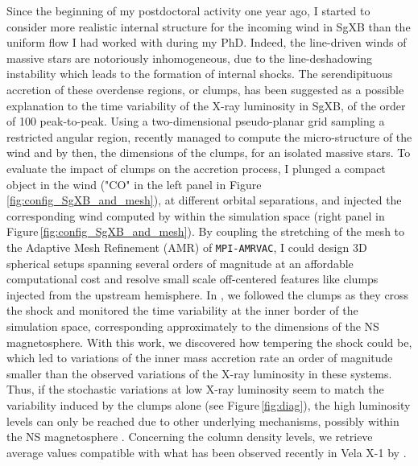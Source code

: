 \documentclass[a4paper,12pt,onecolumn]{article}
\makeatletter
\newcommand{\sgx}{SgXB\xspace}
\newcommand*{\ns}{NS\@\xspace}
\newcommand*{\eg}{e.g.\@\xspace}
\makeatother
\begin{document}
\indent Since the beginning of my postdoctoral activity one year ago, I started to consider more realistic internal structure for the incoming wind in \sgx than the uniform flow I had worked with during my PhD. Indeed, the line-driven winds of massive stars are notoriously inhomogeneous, due to the line-deshadowing instability \citep{Owocki1984a} which leads to the formation of internal shocks. The serendipituous accretion of these overdense regions, or clumps, has been suggested as a possible explanation to the time variability of the X-ray luminosity in \sgx, of the order of 100 peak-to-peak. Using a two-dimensional pseudo-planar grid sampling a restricted angular region, \cite{Sundqvist2017} recently managed to compute the micro-structure of the wind and by then, the dimensions of the clumps, for an isolated massive stars. To evaluate the impact of clumps on the accretion process, I plunged a compact object in the wind ("CO" in the left panel in Figure\,\ref{fig:config_SgXB_and_mesh}), at different orbital separations, and injected the corresponding wind computed by \cite{Sundqvist2017} within the simulation space (right panel in Figure\,\ref{fig:config_SgXB_and_mesh}). By coupling the stretching of the mesh to the Adaptive Mesh Refinement (AMR) of \texttt{MPI-AMRVAC}, I could design 3D spherical setups spanning several orders of magnitude at an affordable computational cost and resolve small scale off-centered features like clumps injected from the upstream hemisphere. In \cite{ElMellah}, we followed the clumps as they cross the shock and monitored the time variability at the inner border of the simulation space, corresponding approximately to the dimensions of the \ns magnetosphere. With this work, we discovered how tempering the shock could be, which led to variations of the inner mass accretion rate an order of magnitude smaller than the observed variations of the X-ray luminosity in these systems. Thus, if the stochastic variations at low X-ray luminosity seem to match the variability induced by the clumps alone (see Figure\,\ref{fig:diag}), the high luminosity levels can only be reached due to other underlying mechanisms, possibly within the \ns magnetosphere \citep[\eg the propeller effect,][]{Bozzo2016}. Concerning the column density levels, we retrieve average values compatible with what has been observed recently in Vela X-1 by \cite{Grinberg2017}.
\end{document}
